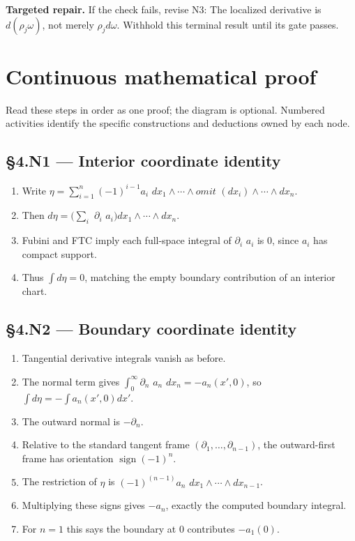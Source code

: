 \documentclass[preprint,12pt,aps,pra,showkeys,amsmath,amssymb,superscriptaddress,floatfix]{revtex4-2}
\theoremstyle{definition}
\theoremstyle{remark}
\newcommand{\field}[2]{\par\smallskip\noindent\textbf{#1.} #2\par}
\begin{document}
\field{Targeted repair}{If the check fails, revise N3: The localized derivative is
\(d(\rho _j\omega )\), not merely \(\rho _jd\omega\). Withhold this
terminal result until its gate passes.}

\endgroup\clearpage\section{Continuous mathematical proof}\label{sec:proof}

Read these steps in order as one proof; the diagram is optional.
Numbered activities identify the specific constructions and deductions
owned by each node.

\subsection{§4.N1 --- Interior coordinate
identity}\label{n1-interior-coordinate-identity}

\begin{enumerate}
\def\labelenumi{\arabic{enumi}.}
\item
  Write \(\eta =\sum _{i=1}^n(-1)^{i-1}a_i\)
  \(dx_{1}\wedge \cdots \wedge omit\)
  \((dx_i)\wedge \cdots \wedge dx_n\).
\item
  Then \(d\eta =(\sum _i\) \(\partial _i\)
  \(a_i)dx_{1}\wedge \cdots \wedge dx_n\).
\item
  Fubini and FTC imply each full-space integral of \(\partial _i\)
  \(a_i\) is 0, since \(a_i\) has compact support.
\item
  Thus \(\int d\eta =0\), matching the empty boundary contribution of an
  interior chart.
\end{enumerate}

\subsection{§4.N2 --- Boundary coordinate
identity}\label{n2-boundary-coordinate-identity}

\begin{enumerate}
\def\labelenumi{\arabic{enumi}.}
\item
  Tangential derivative integrals vanish as before.
\item
  The normal term gives \(\int _{0}^\infty \partial _n\) \(a_n\)
  \(dx_n=-a_n(x',0)\), so \(\int d\eta =-\int a_n(x',0)dx'\).
\item
  The outward normal is \(-\partial _n\).
\item
  Relative to the standard tangent frame
  \((\partial _{1},\ldots ,\partial _{n-1})\), the outward-first frame
  has orientation \(\operatorname{sign} (-1)^n\).
\item
  The restriction of \(\eta\) is \((-1)^{(n-1)}a_n\)
  \(dx_{1}\wedge \cdots \wedge dx_{n-1}\).
\item
  Multiplying these signs gives \(-a_n\), exactly the computed boundary
  integral.
\item
  For \(n=1\) this says the boundary at 0 contributes \(-a_{1}(0)\).
\end{enumerate}
\end{document}
